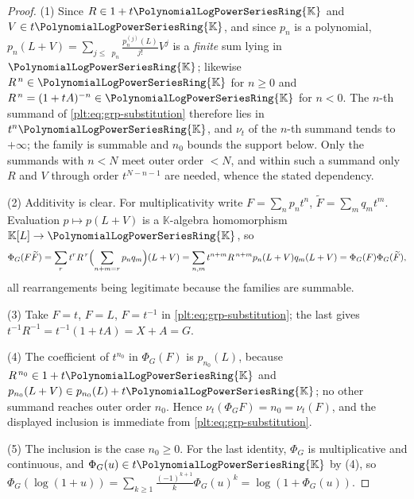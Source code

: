 \documentclass[11pt,oneside]{article}
\theoremstyle{plain}
\theoremstyle{definition}
\theoremstyle{remark}
\newcommand{\K}{\mathbb{K}}
\newcommand{\PLpow}{\PolynomialLogPowerSeriesRing{\K}}   %
\newcommand{\ordt}{\nu_{t}}                              %
\DeclareMathOperator{\degL}{deg_{L}}
\begin{document}
\begin{proof}
(1) Since \(R\in1+t\PLpow\) and \(V\in t\PLpow\), and since \(p_n\) is a
polynomial, \(p_n(L+V)=\sum_{j\le\degL p_n}\frac{p_n^{(j)}(L)}{j!}V^j\) is a
\emph{finite} sum lying in \(\PLpow\); likewise \(R^{\,n}\in\PLpow\) for
\(n\ge0\) and \(R^{\,n}=(1+tA)^{-n}\in\PLpow\) for \(n<0\).  The \(n\)-th
summand of \eqref{plt:eq:grp-substitution} therefore lies in \(t^n\PLpow\), and
\(\ordt\) of the \(n\)-th summand tends to \(+\infty\); the family is summable
and \(n_0\) bounds the support below.  Only the summands with \(n<N\) meet
outer order \(<N\), and within such a summand only \(R\) and \(V\) through
order \(t^{N-n-1}\) are needed, whence the stated dependency.

(2) Additivity is clear.  For multiplicativity write
\(F=\sum_np_nt^n\), \(\widetilde F=\sum_mq_mt^m\).  Evaluation
\(p\mapsto p(L+V)\) is a \(\K\)-algebra homomorphism \(\K[L]\to\PLpow\), so
\[
  \Phi_G(F\widetilde F)
  =\sum_{r}t^rR^{\,r}\Bigl(\sum_{n+m=r}p_nq_m\Bigr)(L+V)
  =\sum_{n,m}t^{n+m}R^{\,n+m}p_n(L+V)q_m(L+V)
  =\Phi_G(F)\Phi_G(\widetilde F),
\]
all rearrangements being legitimate because the families are summable.

(3) Take \(F=t\), \(F=L\), \(F=t^{-1}\) in \eqref{plt:eq:grp-substitution};
the last gives \(t^{-1}R^{-1}=t^{-1}(1+tA)=X+A=G\).

(4) The coefficient of \(t^{n_0}\) in \(\Phi_G(F)\) is \(p_{n_0}(L)\), because
\(R^{\,n_0}\in1+t\PLpow\) and \(p_{n_0}(L+V)\in p_{n_0}(L)+t\PLpow\); no other
summand reaches outer order \(n_0\).  Hence
\(\ordt(\Phi_GF)=n_0=\ordt(F)\), and the displayed inclusion is immediate from
\eqref{plt:eq:grp-substitution}.

(5) The inclusion is the case \(n_0\ge0\).  For the last identity,
\(\Phi_G\) is multiplicative and continuous, and
\(\Phi_G(u)\in t\PLpow\) by (4), so
\(\Phi_G(\log(1+u))=\sum_{k\ge1}\frac{(-1)^{k+1}}{k}\Phi_G(u)^k
 =\log(1+\Phi_G(u))\).
\end{proof}
\end{document}

